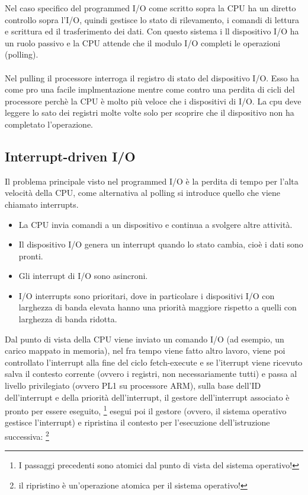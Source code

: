 \hspace{-15pt}Nel caso specifico del programmed I/O come scritto sopra la CPU ha un diretto controllo sopra l'I/O, quindi 
gestisce lo stato di rilevamento, i comandi di lettura e scrittura ed il trasferimento dei dati. Con questo sistema i ll dispositivo I/O ha un ruolo passivo e 
la CPU attende che il modulo I/O completi le operazioni (polling). \\\\
Nel pulling il processore interroga il registro di stato del dispositivo I/O. Esso ha come pro una facile implmentazione
mentre come contro una perdita di cicli del processore perchè la CPU è molto più veloce che i dispositivi di I/O. La cpu deve leggere lo sato dei registri
molte volte solo per scoprire che il dispositivo non ha completato l'operazione.

\subsection{Interrupt-driven I/O}
Il problema principale visto nel programmed I/O è la perdita di tempo per l'alta velocità della CPU, come alternativa al polling
si introduce quello che viene chiamato interrupts.
\begin{itemize}
    \item La CPU invia comandi a un dispositivo e continua a svolgere altre attività. 
    \item Il dispositivo I/O genera un interrupt quando lo stato cambia, cioè i dati sono pronti.
    \item Gli interrupt di I/O sono asincroni.
    \item I/O interrupts sono prioritari, dove in particolare i dispositivi I/O con larghezza di banda elevata hanno una priorità maggiore rispetto a quelli con larghezza di banda ridotta.
\end{itemize} 

\hspace{-15pt}Dal punto di vista della CPU viene inviato un comando I/O (ad esempio, un carico mappato in memoria), nel fra tempo viene fatto altro lavoro, viene poi controllato l'interrupt alla fine del ciclo fetch-execute
e se l'iterrupt viene ricevuto salva il contesto corrente (ovvero i registri, non necessariamente tutti) e passa al livello privilegiato (ovvero PL1 su processore ARM), sulla base dell'ID dell'interrupt e della priorità dell'interrupt, il gestore dell'interrupt associato è pronto per essere eseguito, \footnote{I passaggi precedenti sono atomici dal punto di vista del sistema operativo!} 
esegui poi il gestore (ovvero, il sistema operativo gestisce l'interrupt) e ripristina il contesto per l'esecuzione dell'istruzione successiva: \footnote{il ripristino è un'operazione atomica per il sistema operativo! }

